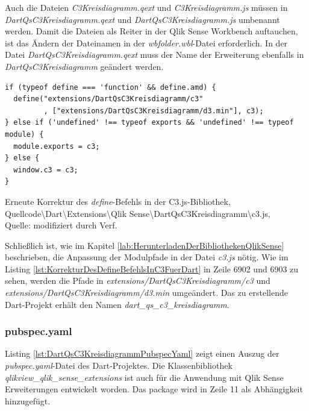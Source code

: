 Auch die Dateien \textit{C3\-Kreis\-diagramm.qext} und \textit{C3\-Kreisdiagramm.js} müssen in \textit{Dart\-Qs\-C3\-Kreis\-diagramm.qext} und \textit{Dart\-Qs\-C3\-Kreis\-diagramm.js} umbenannt werden. Damit die Dateien als Reiter in der Qlik Sense Workbench auftauchen, ist das Ändern der Dateinamen in der \textit{wbfolder.wbl}-Datei erforderlich. In der Datei \textit{Dart\-Qs\-C3\-Kreis\-diagramm.qext} muss der Name der Erweiterung ebenfalls in \textit{Dart\-Qs\-C3\-Kreis\-diagramm} geändert werden.

\ifIncludeFigures\begin{listing}[htbp]
\begin{verbatim}
if (typeof define === 'function' && define.amd) {
  define("extensions/DartQsC3Kreisdiagramm/c3"
         , ["extensions/DartQsC3Kreisdiagramm/d3.min"], c3);
} else if ('undefined' !== typeof exports && 'undefined' !== typeof module) {
  module.exports = c3;
} else {
  window.c3 = c3;
}
\end{verbatim}
\caption[Erneute Korrektur des \textit{define}-Befehls in der C3.js-Bibliothek]{Erneute Korrektur des \textit{define}-Befehls in der C3.js-Bibliothek, \\Quellcode\textbackslash{}Dart\textbackslash{}Extensions\textbackslash{}Qlik Sense\textbackslash{}DartQsC3Kreisdiagramm\textbackslash{}c3.js, \\Quelle: \cite{c3masayuki0812c3} modifiziert durch Verf.}
\label{lst:KorrekturDesDefineBefehlsInC3FuerDart}
\end{listing}\fi

Schließlich ist, wie im Kapitel \ref{lab:HerunterladenDerBibliothekenQlikSense} beschrieben, die Anpassung der Modulpfade in der Datei \textit{c3.js} nötig. Wie im Listing \ref{lst:KorrekturDesDefineBefehlsInC3FuerDart} in Zeile 6902 und 6903 zu sehen, werden die Pfade in \textit{extensions\-/Dart\-Qs\-C3\-Kreis\-diagramm\-/c3} und \textit{extensions\-/Dart\-Qs\-C3\-Kreis\-diagramm\-/d3.min} umgeändert. Das zu erstellende Dart-Projekt erhält den Namen \textit{dart\_qs\_c3\_kreis\-diagramm}.

\subsubsection{pubspec.yaml}

Listing \ref{lst:DartQsC3KreisdiagrammPubspecYaml} zeigt einen Auszug der \textit{pubspec.yaml}-Datei des Dart-Projektes. Die Klassen\-bibliothek \textit{qlikview\_qlik\_sense\_extensions} ist auch für die Anwendung mit Qlik Sense Erweiterungen entwickelt worden. Das package wird in Zeile 11 als Abhängig\-keit hinzugefügt. 


